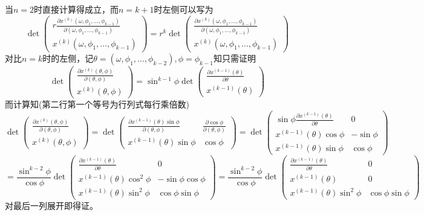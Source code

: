 \documentclass[a4paper,UTF8,fontset=windows,10pt]{ctexart}
\begin{document}
\begin{enumerate}
\begin{itemize}
        当$n=2$时直接计算得成立，而$n=k+1$时左侧可以写为
        $$\det\begin{pmatrix}r\frac{\partial x^{(k)}(\omega,\phi_1,\dots,\phi_{k-1})}{\partial(\omega,\phi_1,\dots,\phi_{k-1})}\\x^{(k)}(\omega,\phi_1,\dots,\phi_{k-1})\end{pmatrix}=r^k\det\begin{pmatrix}\frac{\partial x^{(k)}(\omega,\phi_1,\dots,\phi_{k-1})}{\partial(\omega,\phi_1,\dots,\phi_{k-1})}\\x^{(k)}(\omega,\phi_1,\dots,\phi_{k-1})\end{pmatrix}$$
        对比$n=k$时的左侧，记$\theta=(\omega,\phi_1,\dots,\phi_{k-2}),\phi=\phi_{k-1}$知只需证明
        $$\det\begin{pmatrix}\frac{\partial x^{(k)}(\theta,\phi)}{\partial(\theta,\phi)}\\x^{(k)}(\theta,\phi)\end{pmatrix}=\sin^{k-1}\phi\det\begin{pmatrix}\frac{\partial x^{(k-1)}(\theta)}{\partial\theta}\\x^{(k-1)}(\theta)\end{pmatrix}$$
        而计算知(第二行第一个等号为行列式每行乘倍数)
        $$\det\begin{pmatrix}\frac{\partial x^{(k)}(\theta,\phi)}{\partial(\theta,\phi)}\\x^{(k)}(\theta,\phi)\end{pmatrix}=\det\begin{pmatrix}\frac{\partial x^{(k-1)}(\theta)\sin\phi}{\partial(\theta,\phi)}&\frac{\partial\cos\phi}{\partial(\theta,\phi)}\\x^{(k-1)}(\theta)\sin\phi&\cos\phi\end{pmatrix}=\det\begin{pmatrix}\sin\phi\frac{\partial x^{(k-1)}(\theta)}{\partial\theta}&0\\x^{(k-1)}(\theta)\cos\phi&-\sin\phi\\x^{(k-1)}(\theta)\sin\phi&\cos\phi\end{pmatrix}$$
        $$=\frac{\sin^{k-2}\phi}{\cos\phi}\det\begin{pmatrix}\frac{\partial x^{(k-1)}(\theta)}{\partial\theta}&0\\x^{(k-1)}(\theta)\cos^2\phi&-\sin\phi\cos\phi\\x^{(k-1)}(\theta)\sin^2\phi&\cos\phi\sin\phi\end{pmatrix}=\frac{\sin^{k-2}\phi}{\cos\phi}\det\begin{pmatrix}\frac{\partial x^{(k-1)}(\theta)}{\partial\theta}&0\\x^{(k-1)}(\theta)&0\\x^{(k-1)}(\theta)\sin^2\phi&\cos\phi\sin\phi\end{pmatrix}$$
        对最后一列展开即得证。
    

\end{itemize}
\end{enumerate}
\end{document}
